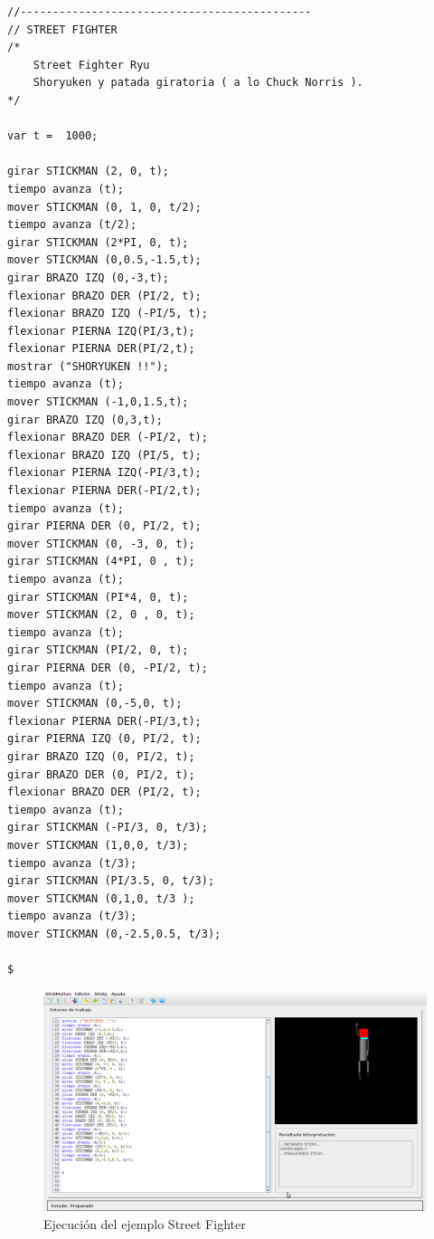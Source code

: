 \documentclass[a4paper, 12pt]{book}
\begin{document}
\begin{itemize}
  
  
\begin{verbatim}
//--------------------------------------------- 
// STREET FIGHTER 
/* 
    Street Fighter Ryu 
    Shoryuken y patada giratoria ( a lo Chuck Norris ). 
*/ 

var t =  1000; 

girar STICKMAN (2, 0, t); 
tiempo avanza (t); 
mover STICKMAN (0, 1, 0, t/2); 
tiempo avanza (t/2); 
girar STICKMAN (2*PI, 0, t); 
mover STICKMAN (0,0.5,-1.5,t); 
girar BRAZO IZQ (0,-3,t); 
flexionar BRAZO DER (PI/2, t); 
flexionar BRAZO IZQ (-PI/5, t); 
flexionar PIERNA IZQ(PI/3,t); 
flexionar PIERNA DER(PI/2,t); 
mostrar ("SHORYUKEN !!"); 
tiempo avanza (t); 
mover STICKMAN (-1,0,1.5,t); 
girar BRAZO IZQ (0,3,t); 
flexionar BRAZO DER (-PI/2, t); 
flexionar BRAZO IZQ (PI/5, t); 
flexionar PIERNA IZQ(-PI/3,t); 
flexionar PIERNA DER(-PI/2,t); 
tiempo avanza (t); 
girar PIERNA DER (0, PI/2, t); 
mover STICKMAN (0, -3, 0, t); 
girar STICKMAN (4*PI, 0 , t); 
tiempo avanza (t); 
girar STICKMAN (PI*4, 0, t); 
mover STICKMAN (2, 0 , 0, t); 
tiempo avanza (t); 
girar STICKMAN (PI/2, 0, t); 
girar PIERNA DER (0, -PI/2, t); 
tiempo avanza (t); 
mover STICKMAN (0,-5,0, t); 
flexionar PIERNA DER(-PI/3,t); 
girar PIERNA IZQ (0, PI/2, t); 
girar BRAZO IZQ (0, PI/2, t); 
girar BRAZO DER (0, PI/2, t); 
flexionar BRAZO DER (PI/2, t); 
tiempo avanza (t); 
girar STICKMAN (-PI/3, 0, t/3); 
mover STICKMAN (1,0,0, t/3); 
tiempo avanza (t/3); 
girar STICKMAN (PI/3.5, 0, t/3); 
mover STICKMAN (0,1,0, t/3 ); 
tiempo avanza (t/3); 
mover STICKMAN (0,-2.5,0.5, t/3); 

$
\end{verbatim}
  
  
  
  
  \begin{figure}[htb]
    \centerline{\includegraphics[width=\textwidth]{./imagenes/streetfighter1.png}}
    \caption{Ejecución del ejemplo Street Fighter}
\end{figure}


\end{itemize}
\end{document}
